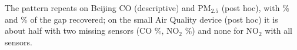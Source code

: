 The pattern repeats on Beijing CO (descriptive) and PM$_{2.5}$ (post hoc), with \VthreebeijingcoeZerorecovered\% and
\Xplctpmrecovered\% of the gap recovered; on the small Air Quality device (post hoc) it is about half with two missing
sensors (CO \XplctairqcoeTworecovered\%, NO$_2$ \XplctairqnoTwoeTworecovered\%) and none for NO$_2$ with all sensors.
